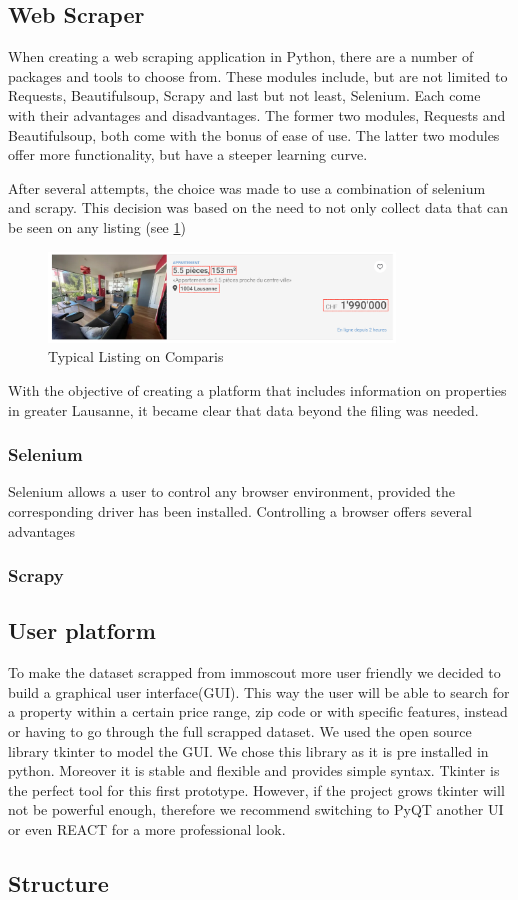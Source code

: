\documentclass[main]{subfiles}
\begin{document}
\subsection{Web Scraper}

When creating a web scraping application in Python, there are a number of packages and tools to choose from.
These modules include, but are not limited to Requests, Beautifulsoup, Scrapy and last but not least, Selenium.
Each come with their advantages and disadvantages. 
The former two modules, Requests and Beautifulsoup, both come with the bonus of ease of use.
The latter two modules offer more functionality, but have a steeper learning curve.

After several attempts, the choice was made to use a combination of selenium and scrapy.
This decision was based on the need to not only collect data that can be seen on any listing (see \ref{fig:listing}) 
\begin{figure}[htbp]
    \centerline{
        \includegraphics[width = 92mm]{prog_1.png}}
    \caption{Typical Listing on Comparis}
    \label{fig:listing}
\end{figure}

With the objective of creating a platform that includes information on properties in greater Lausanne, 
it became clear that data beyond the filing was needed.


\subsubsection{Selenium}
Selenium allows a user to control any browser environment, provided the corresponding driver has been installed.
Controlling a browser offers several advantages 

\subsubsection{Scrapy}




\subsection{User platform}
To make the dataset scrapped from immoscout more user friendly we decided to build a graphical user interface(GUI).
This way the user will be able to search for a property within a certain price range, zip code or with specific features, 
instead or having to go through the full scrapped dataset.
We used the open source library tkinter to model the GUI. We chose this library as it is pre installed in python.
Moreover it is stable and flexible and provides simple syntax.
Tkinter is the perfect tool for this first prototype. However, if the project grows tkinter will not be powerful enough,
therefore we recommend switching to PyQT another UI or even REACT for a more professional look. 


\subsection{Structure}
\end{document}
